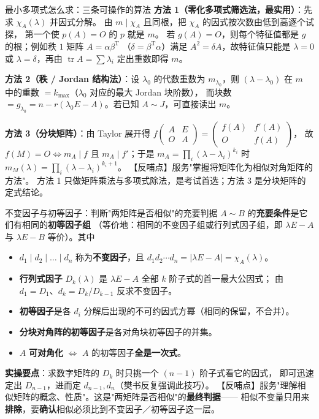 \begin{fdeep}{最小多项式怎么求：三条可操作的算法}
\textbf{方法 1（零化多项式筛选法，最实用）}：先求 $\chi_A(\lambda)$ 并因式分解。
由 $m\mid\chi_A$ 且同根，把 $\chi_A$ 的因式按次数由低到高逐个试探，
第一个使 $p(A)=O$ 的 $p$ 就是 $m$。
若 $g(A)=O$，则每个特征值都是 $g$ 的根；例如秩 $1$ 矩阵 $A=\alpha\beta^{\mathrm T}$
（$\delta=\beta^{\mathrm T}\alpha$）满足 $A^{2}=\delta A$，故特征值只能是
$\lambda=0$ 或 $\lambda=\delta$，再由 $\operatorname{tr}A=\sum\lambda_i$ 定出重数即得 $m$。

\textbf{方法 2（秩 / Jordan 结构法）}：设 $\lambda_0$ 的代数重数为 $m_{\lambda_0}$，则
$(\lambda-\lambda_0)$ 在 $m$ 中的重数 $=k_{\max}$（$\lambda_0$ 对应的最大 Jordan 块阶数），
而块数 $=g_{\lambda_0}=n-r(\lambda_0E-A)$。若已知 $A\sim J$，可直接读出 $m$。

\textbf{方法 3（分块矩阵）}：由 Taylor 展开得
$f\!\begin{pmatrix}A&E\\O&A\end{pmatrix}=\begin{pmatrix}f(A)&f'(A)\\O&f(A)\end{pmatrix}$，
故 $f(M)=O\iff m_A\mid f$ 且 $m_A\mid f'$；于是
$m_A=\prod_i(\lambda-\lambda_i)^{k_i}$ 时 $m_M(\lambda)=\prod_i(\lambda-\lambda_i)^{k_i+1}$。
【反哺点】服务"掌握将矩阵化为相似对角矩阵的方法"。
方法 1 只做矩阵乘法与多项式除法，是考试首选；方法 3 是分块矩阵的定式结论。
\end{fdeep}

\begin{fdeep}{不变因子与初等因子：判断"两矩阵是否相似"的充要判据}
$A\sim B$ 的\textbf{充要条件}是它们有相同的\textbf{初等因子组}
（等价地：相同的不变因子组或行列式因子组，即 $\lambda E-A$ 与 $\lambda E-B$ 等价）。其中
\begin{itemize}[leftmargin=1.8em,itemsep=0.15em]
\item $d_1\mid d_2\mid\dots\mid d_n$ 称为\textbf{不变因子}，且
      $d_1d_2\cdots d_n=\lvert\lambda E-A\rvert=\chi_A(\lambda)$。
\item \textbf{行列式因子} $D_k(\lambda)$ 是 $\lambda E-A$ 全部 $k$ 阶子式的首一最大公因式；
      由 $d_1=D_1$、$d_k=D_k/D_{k-1}$ 反求不变因子。
\item \textbf{初等因子}是各 $d_i$ 分解后出现的不可约因式方幂（相同的保留，不合并）。
\item \textbf{分块对角阵的初等因子}是各对角块初等因子的并集。
\item $A$ \textbf{可对角化} $\iff$ $A$ 的初等因子\textbf{全是一次式}。
\end{itemize}
\textbf{实操要点}：求数字矩阵的 $D_k$ 时只挑一个 $(n-1)$ 阶子式看它的因式，
即可迅速定出 $D_{n-1}$，进而定 $d_{n-1},d_n$（樊书反复强调此技巧）。
【反哺点】服务"理解相似矩阵的概念、性质"。这是"两矩阵是否相似"的\textbf{最终判据}——
相似不变量只用来\textbf{排除}，要\textbf{确认}相似必须比到不变因子／初等因子这一层。
\end{fdeep}

